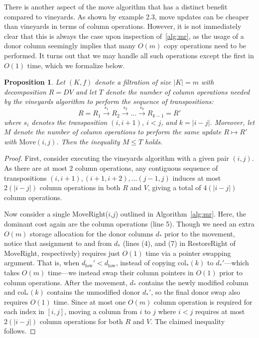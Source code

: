 \documentclass[sn-mathphys]{sn-jnl}
\newtheorem{proposition}{Proposition}
\begin{document}
There is another aspect of the move algorithm that has a distinct benefit compared to vineyards. As shown by example 2.3, move updates can be cheaper than vineyards in terms of column operations. However, it is not immediately clear that this is always the case upon inspection of~\ref{alg:mr}, as the usage of a donor column seemingly implies that many $O(m)$ copy operations need to be performed. 
It turns out that we may handle all such operations except the first in $O(1)$ time, which we formalize below.
\begin{proposition}\label{prop:factor2}
	Let $(K,f)$ denote a filtration of size $\lvert K \rvert = m$ with decomposition $R = D V$ and let $T$ denote the number of column operations needed by the vineyards algorithm to perform the sequence of transpositions:
	$$ R = R_1 \overset{s_1}{\to} R_2 \overset{s_2}{\to} \dots \overset{s_k}{\to} R_{k-1} = R' $$
	where $s_i$ denotes the transposition $(i,i+1)$, $i < j$, and $k = \lvert i - j\rvert$. Moreover, let $M$ denote the number of column operations to perform the same update $R \mapsto R'$ with $\mathrm{Move}(i,j)$. Then the inequality $M \leq T$ holds.
\end{proposition}
\begin{proof} \normalsize
First, consider executing the vineyards algorithm with a given pair $(i, j)$. As there are at most $2$ column operations, any contiguous sequence of transpositions $(i,i+1), (i+1,i+2), \ldots (j-1,j)$ induces at most $2(\lvert i - j \rvert)$ column operations in both $R$ and $V$, giving a total of $4(\lvert i - j \rvert)$ column operations.

Now consider a single MoveRight($i$,$j$) outlined in Algorithm~\ref{alg:mr}. Here, the dominant cost again are the column operations (line 5). 
Though we need an extra $O(m)$ storage allocation for the donor columns $d_\ast$ prior to the movement, notice that assignment to and from $d_\ast$ (lines (4), and (7) in RestoreRight of MoveRight, respectively) requires just $O(1)$ time via a pointer swapping argument. That is, when $d_\mathrm{low}' < d_\mathrm{low}$, instead of copying $\mathrm{col}_\ast(k)$ to $d_\ast'$---which takes $O(m)$ time---we instead swap their column pointers in $O(1)$   prior to column operations. After the movement, $d_\ast$ contains the newly modified column and $\mathrm{col}_\ast(k)$ contains the unmodified donor $d_\ast'$, so the final donor swap also requires $O(1)$ time. 
Since at most one $O(m)$ column operation is required for each index in $[i, j]$, moving a column from $i$ to $j$ where $i < j$ requires at most $2(\lvert i - j \rvert)$ column operations for both $R$ and $V$. The claimed inequality follows. 
\end{proof}
\end{document}

